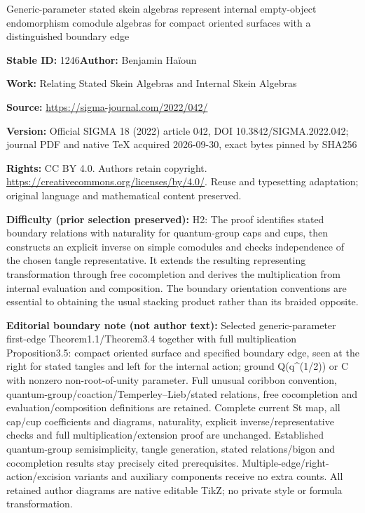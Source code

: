 \documentclass[11pt]{article}
\numberwithin{equation}{section}
\numberwithin{equation}{section}
\begin{document}
\begin{center}\Large Generic-parameter stated skein algebras represent internal empty-object endomorphism comodule algebras for compact oriented surfaces with a distinguished boundary edge\end{center}
\noindent\textbf{Stable ID:} 1246\quad\textbf{Author:} Benjamin Haïoun\par
\noindent\textbf{Work:} Relating Stated Skein Algebras and Internal Skein Algebras\par
\noindent\textbf{Source:} \url{https://sigma-journal.com/2022/042/}\par
\noindent\textbf{Version:} Official SIGMA 18 (2022) article 042, DOI 10.3842/SIGMA.2022.042; journal PDF and native TeX acquired 2026-09-30, exact bytes pinned by SHA256\par
\noindent\textbf{Rights:} CC BY 4.0. Authors retain copyright. \url{https://creativecommons.org/licenses/by/4.0/}. Reuse and typesetting adaptation; original language and mathematical content preserved.\par
\noindent\textbf{Difficulty (prior selection preserved):} {\CJKfont H2: The proof identifies stated boundary relations with naturality for quantum-group caps and cups, then constructs an explicit inverse on simple comodules and checks independence of the chosen tangle representative. It extends the resulting representing transformation through free cocompletion and derives the multiplication from internal evaluation and composition. The boundary orientation conventions are essential to obtaining the usual stacking product rather than its braided opposite.}\par
\medskip\noindent\textbf{Editorial boundary note (not author text):} Selected generic-parameter first-edge Theorem1.1/Theorem3.4 together with full multiplication Proposition3.5: compact oriented surface and specified boundary edge, seen at the right for stated tangles and left for the internal action; ground Q(q\textasciicircum{}(1/2)) or C with nonzero non-root-of-unity parameter. Full unusual coribbon convention, quantum-group/coaction/Temperley–Lieb/stated relations, free cocompletion and evaluation/composition definitions are retained. Complete current St map, all cap/cup coefficients and diagrams, naturality, explicit inverse/representative checks and full multiplication/extension proof are unchanged. Established quantum-group semisimplicity, tangle generation, stated relations/bigon and cocompletion results stay precisely cited prerequisites. Multiple-edge/right-action/excision variants and auxiliary components receive no extra counts. All retained author diagrams are native editable TikZ; no private style or formula transformation.\par
\end{document}
